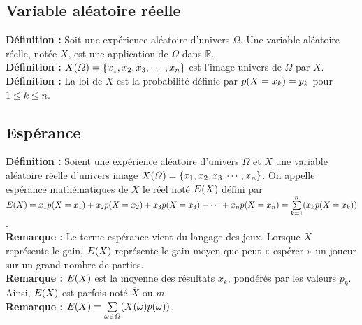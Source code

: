 \documentclass[a4paper,titlepage]{article}
\let\oldleft\left
\renewcommand{\left}{\mathopen{}\mathclose\bgroup\oldleft}
\let\oldright\right
\renewcommand{\right}{\aftergroup\egroup\oldright}
\begin{document}
    \subsection{Variable aléatoire réelle}
        \textbf{Définition :} Soit une expérience aléatoire d’univers $\varOmega$. Une variable aléatoire réelle, notée $X$, est une application de $\varOmega$ dans $\mathbb{R}$.
        \\
        \textbf{Définition :} $X\left(\varOmega\right)=\left\{x_{1},x_{2},x_{3},\cdots,x_{n}\right\}$ est l’image univers de $\varOmega$ par $X$.
        \\
        \textbf{Définition :} La loi de $X$ est la probabilité définie par $p\left(X=x_{k}\right)=p_{k}$ pour $1\leqslant k\leqslant n$.
    \subsection{Espérance}
        \textbf{Définition :} Soient une expérience aléatoire d’univers $\varOmega$ et $X$ une variable aléatoire réelle d’univers image $X\left(\varOmega\right)=\left\{x_{1},x_{2},x_{3},\cdots,x_{n}\right\}$. On appelle espérance mathématiques de $X$ le réel noté $E\left(X\right)$ défini par $E\left(X\right)=x_{1}p\left(X=x_{1}\right)+x_{2}p\left(X=x_{2}\right)+x_{3}p\left(X=x_{3}\right)+\cdots+x_{n}p\left(X=x_{n}\right)=\sum\limits_{k=1}^{n}\left(x_{k}p\left(X=x_{k}\right)\right)$.
        \\
        \textbf{Remarque :} Le terme espérance vient du langage des jeux. Lorsque $X$ représente le gain, $E\left(X\right)$ représente le gain moyen que peut « espérer » un joueur sur un grand nombre de parties.
        \\
        \textbf{Remarque :} $E\left(X\right)$ est la moyenne des résultats $x_{k}$, pondérés par les valeurs $p_{k}$. Ainsi, $E\left(X\right)$ est parfois noté $\overline{X}$ ou $m$.
        \\
        \textbf{Remarque :} $E\left(X\right)=\sum\limits_{\omega\in\varOmega}\left(X\left(\omega\right)p\left(\omega\right)\right)$.
\end{document}
